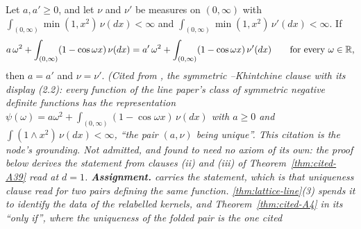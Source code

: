 \begin{theorem}
\label{thm:cited-A9}
\leanok
Let $a, a' \ge 0$, and let $\nu$ and $\nu'$ be measures on $(0,\infty)$ with
$\int_{(0,\infty)}\min(1, x^2)\,\nu(dx) < \infty$ and
$\int_{(0,\infty)}\min(1, x^2)\,\nu'(dx) < \infty$. If
\[
  a\,\omega^2 + \int_{(0,\infty)}(1 - \cos\omega x)\,\nu(dx)
  = a'\,\omega^2 + \int_{(0,\infty)}(1 - \cos\omega x)\,\nu'(dx)
  \qquad\text{for every } \omega \in \mathbb{R},
\]
then $a = a'$ and $\nu = \nu'$.
\statusA\quad{}\quad\emph{(Cited from , the
symmetric \Levy--Khintchine clause with its display (2.2): every function of the line paper's
class of symmetric negative definite functions has the representation
$\psi(\omega) = a\omega^2 + \int_{(0,\infty)}(1 - \cos\omega x)\,\nu(dx)$ with $a \ge 0$ and
$\int(1 \wedge x^2)\,\nu(dx) < \infty$, ``the pair $(a,\nu)$ being unique''. This citation is the
node's grounding. Not admitted, and found to need no axiom of its own: the proof below derives the
statement from clauses (ii) and (iii) of Theorem~\ref{thm:cited-A39} read at $d = 1$.
\textbf{Assignment.}  carries the statement,
which is that uniqueness clause read for two pairs defining the same function.
\ref{thm:lattice-line}(3) spends it to identify the data of the relabelled kernels, and
Theorem~\ref{thm:cited-A4} in its ``only if'', where the uniqueness of the folded pair is the one cited
}
\end{theorem}
